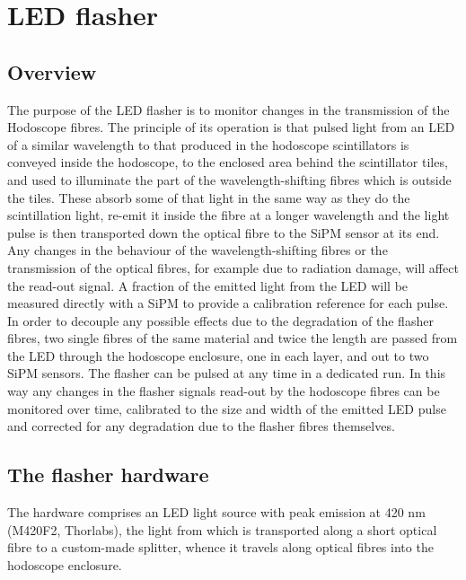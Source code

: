 \documentclass[12pt]{article}
\begin{document}
\section{LED flasher}

\subsection{Overview}

The purpose of the LED flasher is to monitor changes in the transmission of the Hodoscope fibres. The principle of its operation is that pulsed light from an LED of a similar wavelength to that produced in the hodoscope scintillators is conveyed inside the hodoscope, to the enclosed area behind the scintillator tiles, and used to illuminate the part of the wavelength-shifting fibres which is outside the tiles. These absorb some of that light in the same way as they do the scintillation light, re-emit it inside the fibre at a longer wavelength and the light pulse is then transported down the optical fibre to the SiPM sensor at its end. Any changes in the behaviour of the wavelength-shifting fibres or the transmission of the optical fibres, for example due to radiation damage, will affect the read-out signal. A fraction of the emitted light from the LED will be measured directly with a SiPM to provide a calibration reference for each pulse. In order to decouple any possible effects due to the degradation of the flasher fibres, two single fibres of the same material and twice the length are passed from the LED through the hodoscope enclosure, one in each layer, and out to two SiPM sensors. The flasher can be pulsed at any time in a dedicated run. In this way any changes in the flasher signals read-out by the hodoscope fibres can be monitored over time, calibrated to the size and width of the emitted LED pulse and corrected for any degradation due to the flasher fibres themselves.  

\subsection{The flasher hardware}

The hardware comprises an LED light source with peak emission at 420 nm (M420F2, Thorlabs), the light from which is transported along a short optical fibre to a custom-made splitter, whence it travels along optical fibres into the hodoscope enclosure. 
\end{document}

